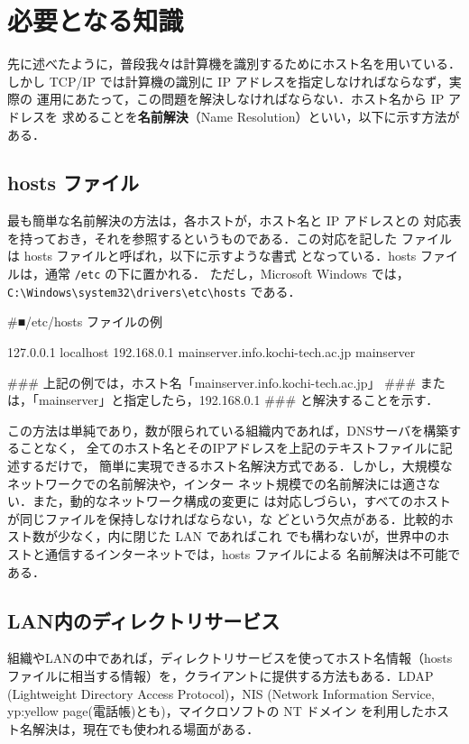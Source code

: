 \section{必要となる知識}
先に述べたように，普段我々は計算機を識別するためにホスト名を用いている．
しかし TCP/IP では計算機の識別に IP アドレスを指定しなければならなず，実際の
運用にあたって，この問題を解決しなければならない．ホスト名から IP アドレスを
求めることを{\bf 名前解決}（Name Resolution）といい，以下に示す方法がある．

\subsection*{hosts ファイル}
最も簡単な名前解決の方法は，各ホストが，ホスト名と IP アドレスとの
対応表を持っておき，それを参照するというものである．この対応を記した
ファイルは hosts ファイルと呼ばれ，以下に示すような書式
となっている．hosts ファイルは，通常 \texttt{/etc} の下に置かれる．
ただし，Microsoft Windows では，
\verb|C:\Windows\system32\drivers\etc\hosts| である．


\begin{cli}
#■/etc/hosts ファイルの例

127.0.0.1    localhost
192.168.0.1  mainserver.info.kochi-tech.ac.jp  mainserver

### 上記の例では，ホスト名「mainserver.info.kochi-tech.ac.jp」
### または，「mainserver」と指定したら，192.168.0.1
### と解決することを示す．
\end{cli}

この方法は単純であり，数が限られている組織内であれば，DNSサーバを構築することなく，
全てのホスト名とそのIPアドレスを上記のテキストファイルに記述するだけで，
簡単に実現できるホスト名解決方式である．しかし，大規模なネットワークでの名前解決や，インター
ネット規模での名前解決には適さない．また，動的なネットワーク構成の変更に
は対応しづらい，すべてのホストが同じファイルを保持しなければならない，な
どという欠点がある．比較的ホスト数が少なく，内に閉じた LAN であればこれ
でも構わないが，世界中のホストと通信するインターネットでは，hosts ファイルによる
名前解決は不可能である．

\subsection*{LAN内のディレクトリサービス}

組織やLANの中であれば，ディレクトリサービスを使ってホスト名情報（hostsファイルに相当する情報）を，クライアントに提供する方法もある．LDAP (Lightweight Directory Access Protocol)，NIS (Network Information Service, yp:yellow page(電話帳)とも)，マイクロソフトの NT ドメイン を利用したホスト名解決は，現在でも使われる場面がある．

